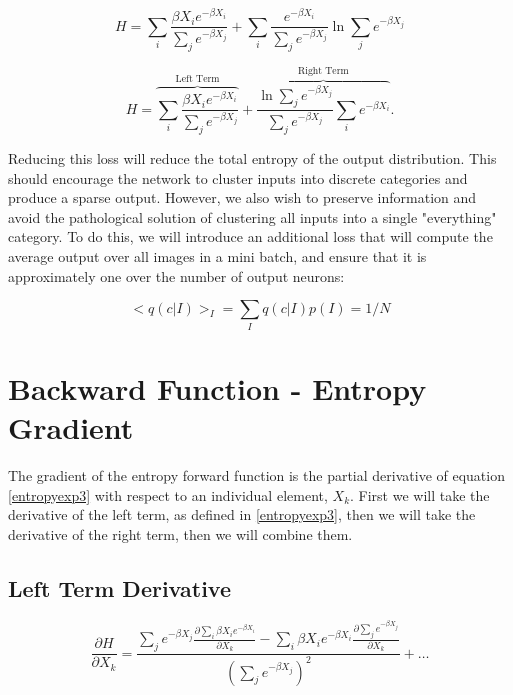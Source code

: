 \begin{displaymath}
    H =
    \sum_{i}\frac{\beta X_{i} e^{-\beta X_{i}}}{\sum_{j}e^{-\beta X_{j}}} + 
    \sum_{i}\frac{e^{-\beta X_{i}}}{\sum_{j}e^{-\beta X_{j}}}\ln{\sum_{j}e^{-\beta X_{j}}}
\label{entropyexp2}
\end{displaymath}

\begin{equation}
    H =
    \overbrace{\sum_{i}\frac{\beta X_{i}e^{-\beta X_{i}}}{\sum_{j}e^{-\beta X_{j}}}}^\text{Left Term} + 
    \overbrace{\frac{\ln{\sum_{j}e^{-\beta X_{j}}}}{\sum_{j}e^{-\beta X_{j}}}\sum_{i}e^{-\beta X_{i}}}^\text{Right Term}.
\label{entropyexp3}
\end{equation}

\noindent Reducing this loss will reduce the total entropy of the output distribution. This should encourage the network to cluster inputs into discrete categories and produce a sparse output. However, we also wish to preserve information and avoid the pathological solution of clustering all inputs into a single "everything" category. To do this, we will introduce an additional loss that will compute the average output over all images in a mini batch, and ensure that it is approximately one over the number of output neurons: 

\begin{equation}
<q(c|I)>_{I} = \sum_{I}q(c|I)p(I) = 1/N
\end{equation}

\section{Backward Function - Entropy Gradient} \label{backward}
\noindent The gradient of the entropy forward function is the partial derivative of equation \ref{entropyexp3} with respect to an individual element, $X_{k}$. First we will take the derivative of the left term, as defined in \ref{entropyexp3}, then we will take the derivative of the right term, then we will combine them.

\subsection{Left Term Derivative}


\begin{displaymath}
    \frac{\partial H}{\partial X_{k}} =
    \frac{\sum_{j}e^{-\beta X_{j}}\frac{\partial\sum_{i}\beta X_{i} e^{-\beta X_{i}}}{\partial X_{k}}
    - \sum_{i}\beta X_{i} e^{-\beta X_{i}}\frac{\partial\sum_{j}e^{-\beta X_{j}}}{\partial X_{k}}}{\left(\sum_{j}e^{-\beta X_{j}}\right)^{2}}
    + \ldots
\end{displaymath}

